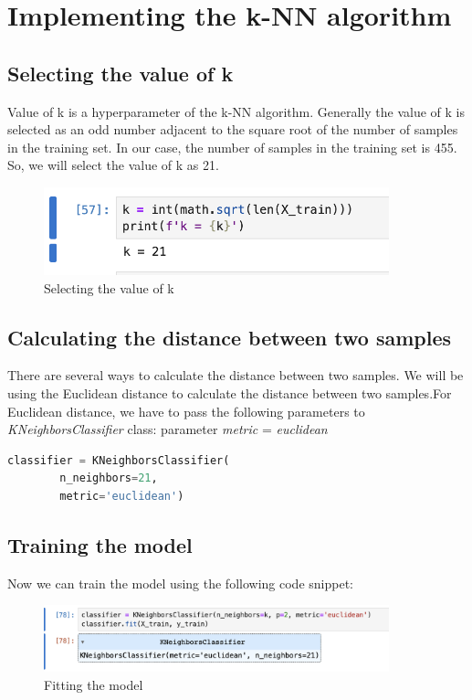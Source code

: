 \section{Implementing the k-NN algorithm}
\subsection{Selecting the value of k}
Value of k is a hyperparameter of the k-NN algorithm. Generally the value of k is selected as an odd number adjacent to the square root of the number of samples in the training set. In our case, the number of samples in the training set is 455. So, we will select the value of k as 21.
\begin{figure}[h]
    \centering
    \includegraphics[width=10cm]{ch/figures/k-select.png}
    \caption{Selecting the value of k}
    \label{fig:ksel}
\end{figure}
\subsection{Calculating the distance between two samples}
There are several ways to calculate the distance between two samples. We will be using the Euclidean distance to calculate the distance between two samples.For Euclidean distance, we have to pass the following parameters to \textit{KNeighborsClassifier} class:
parameter \textit{metric} = \textit{euclidean}
\begin{lstlisting}[language=Python]
    classifier = KNeighborsClassifier(
        n_neighbors=21, 
        metric='euclidean')
\end{lstlisting}

\subsection{Training the model}
Now we can train the model using the following code snippet:
\begin{figure}[h]
    \centering
    \includegraphics[width=10cm]{ch/figures/fit.png}
    \caption{Fitting the model}
    \label{fig:fit}
\end{figure}

